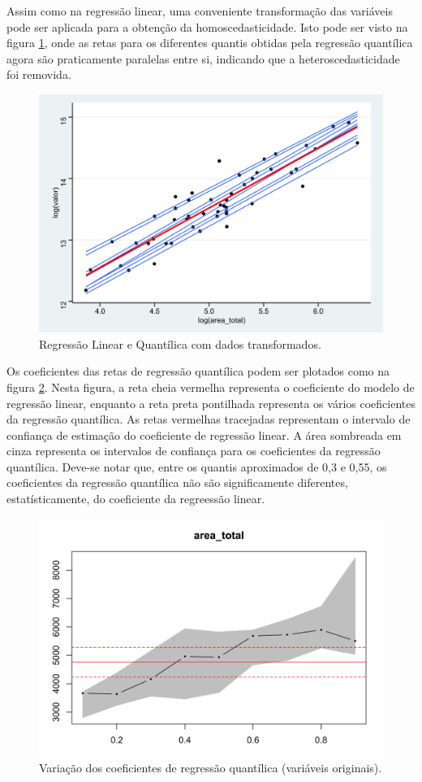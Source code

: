 \documentclass[a4paper, 12pt]{article}
\begin{document}
Assim como na regressão linear, uma conveniente transformação das
variáveis pode ser aplicada para a obtenção da homoscedasticidade. Isto
pode ser visto na figura \ref{fig:qr2}, onde as retas para os diferentes
quantis obtidas pela regressão quantílica agora são praticamente
paralelas entre si, indicando que a heteroscedasticidade foi removida.

\begin{figure}[H]

{\centering \includegraphics[width=0.7\linewidth]{images/qr2-1} 

}

\caption{Regressão Linear e Quantílica com dados transformados.}\label{fig:qr2}
\end{figure}

Os coeficientes das retas de regressão quantílica podem ser plotados
como na figura \ref{fig:coef1}. Nesta figura, a reta cheia vermelha
representa o coeficiente do modelo de regressão linear, enquanto a reta
preta pontilhada representa os vários coeficientes da regressão
quantílica. As retas vermelhas tracejadas representam o intervalo de
confiança de estimação do coeficiente de regressão linear. A área
sombreada em cinza representa os intervalos de confiança para os
coeficientes da regressão quantílica. Deve-se notar que, entre os
quantis aproximados de 0,3 e 0,55, os coeficientes da regressão
quantílica não são significamente diferentes, estatísticamente, do
coeficiente da regreessão linear.

\begin{figure}[H]

{\centering \includegraphics[width=0.7\linewidth]{images/coef1-1} 

}

\caption{Variação dos coeficientes de regressão quantílica (variáveis originais).}\label{fig:coef1}
\end{figure}
\end{document}

